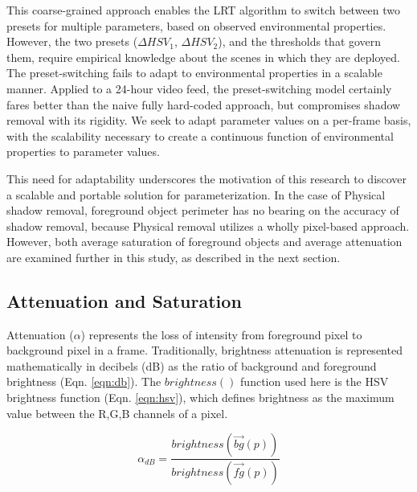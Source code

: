 This coarse-grained approach enables the LRT algorithm to switch between two presets for multiple parameters, based on observed environmental properties. However, the two presets ($\Delta HSV_{1}$, $\Delta HSV_{2}$), and the thresholds that govern them, require empirical knowledge about the scenes in which they are deployed. The preset-switching fails to adapt to environmental properties in a scalable manner. Applied to a 24-hour video feed, the preset-switching model certainly fares better than the naive fully hard-coded approach, but compromises shadow removal with its rigidity. We seek to adapt parameter values on a per-frame basis, with the scalability necessary to create a continuous function of environmental properties to parameter values.



This need for adaptability underscores the motivation of this research to discover a scalable and portable solution for parameterization. In the case of Physical shadow removal, foreground object perimeter has no bearing on the accuracy of shadow removal, because Physical removal utilizes a wholly pixel-based approach. However, both average saturation of foreground objects and average attenuation are examined further in this study, as described in the next section.

\subsection{Attenuation and Saturation}

 Attenuation ($\alpha$) represents the loss of intensity from foreground pixel to background pixel in a frame. Traditionally, brightness attenuation is represented mathematically in decibels (dB) as the ratio of background and foreground brightness (Eqn. \ref{eqn:db}). The $brightness()$ function used here is the HSV brightness function (Eqn. \ref{eqn:hsv}), which defines brightness as the maximum value between the R,G,B channels of a pixel. 

\begin{equation}
\alpha_{dB} = \dfrac{brightness(\vec{bg}(p))}{brightness(\vec{fg}(p))}
\label{eqn:db}
\end{equation}

